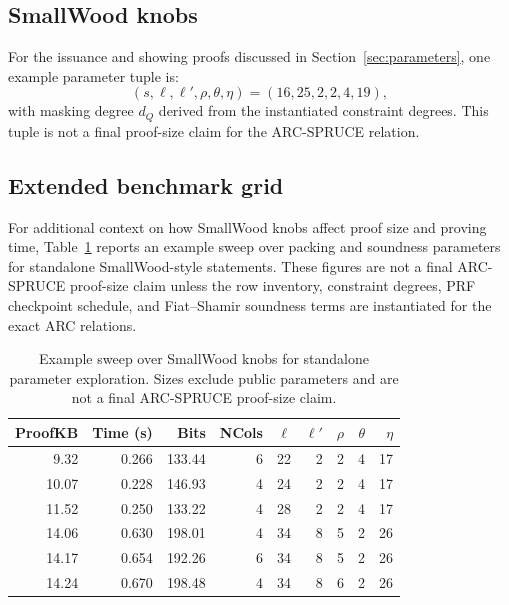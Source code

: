 \subsection{SmallWood knobs}
For the issuance and showing proofs discussed in Section~\ref{sec:parameters}, one example parameter tuple is:
\[
  (s,\ell,\ell',\rho,\theta,\eta)=(16,25,2,2,4,19),
\]
with masking degree \(d_Q\) derived from the instantiated constraint degrees.  This tuple is not a final proof-size
claim for the ARC-SPRUCE relation.

\subsection{Extended benchmark grid}
For additional context on how SmallWood knobs affect proof size and proving time, Table~\ref{tab:results-grid}
reports an example sweep over packing and soundness parameters for standalone SmallWood-style statements.  These
figures are not a final ARC-SPRUCE proof-size claim unless the row inventory, constraint degrees, PRF checkpoint
schedule, and Fiat--Shamir soundness terms are instantiated for the exact ARC relations.

\begin{table}[H]
\centering
\footnotesize
\setlength{\tabcolsep}{4pt}
\begin{tabular}{r r r r r r r r r}
\toprule
\textbf{ProofKB} & \textbf{Time (s)} & \textbf{Bits} & \textbf{NCols} & \(\ell\) & \(\ell'\) & \(\rho\) & \(\theta\) & \(\eta\)\\
\midrule
\ \ 9.32 & 0.266 & 133.44 & 6 & 22 & 2 & 2 & 4 & 17 \\
10.07 & 0.228 & 146.93 & 4 & 24 & 2 & 2 & 4 & 17 \\
11.52 & 0.250 & 133.22 & 4 & 28 & 2 & 2 & 4 & 17 \\
\midrule[1.2pt]
14.06 & 0.630 & 198.01 & 4 & 34 & 8 & 5 & 2 & 26 \\
14.17 & 0.654 & 192.26 & 6 & 34 & 8 & 5 & 2 & 26 \\
14.24 & 0.670 & 198.48 & 4 & 34 & 8 & 6 & 2 & 26 \\
\bottomrule
\end{tabular}
\caption{Example sweep over SmallWood knobs for standalone parameter exploration.  Sizes exclude public parameters and
are not a final ARC-SPRUCE proof-size claim.}
\label{tab:results-grid}
\end{table}
